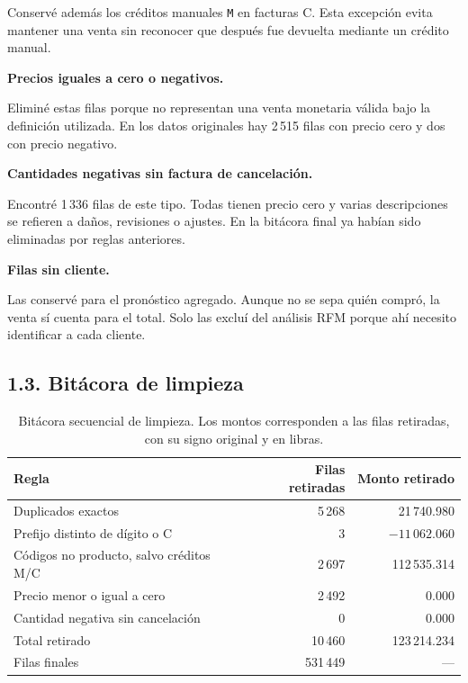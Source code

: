 \documentclass[11pt,letterpaper]{article}
\begin{document}
Conservé además los créditos manuales \texttt{M} en facturas C. Esta excepción evita mantener una venta sin reconocer que después fue devuelta mediante un crédito manual.

\textbf{Precios iguales a cero o negativos.}

Eliminé estas filas porque no representan una venta monetaria válida bajo la definición utilizada. En los datos originales hay 2\,515 filas con precio cero y dos con precio negativo.

\textbf{Cantidades negativas sin factura de cancelación.}

Encontré 1\,336 filas de este tipo. Todas tienen precio cero y varias descripciones se refieren a daños, revisiones o ajustes. En la bitácora final ya habían sido eliminadas por reglas anteriores.

\textbf{Filas sin cliente.}

Las conservé para el pronóstico agregado. Aunque no se sepa quién compró, la venta sí cuenta para el total. Solo las excluí del análisis RFM porque ahí necesito identificar a cada cliente.

\subsection*{1.3. Bitácora de limpieza}

\begin{table}[H]
\centering
\small
\caption{Bitácora secuencial de limpieza. Los montos corresponden a las filas retiradas, con su signo original y en libras.}
\begin{tabularx}{\linewidth}{Xrr}
\toprule
Regla & Filas retiradas & Monto retirado\\
\midrule

Duplicados exactos
& 5\,268
& 21\,740.980\\

Prefijo distinto de dígito o C
& 3
& $-11\,062.060$\\

Códigos no producto, salvo créditos M/C
& 2\,697
& 112\,535.314\\

Precio menor o igual a cero
& 2\,492
& 0.000\\

Cantidad negativa sin cancelación
& 0
& 0.000\\

\midrule

Total retirado
& 10\,460
& 123\,214.234\\

Filas finales
& 531\,449
& ---\\

\bottomrule
\end{tabularx}
\end{table}
\end{document}
